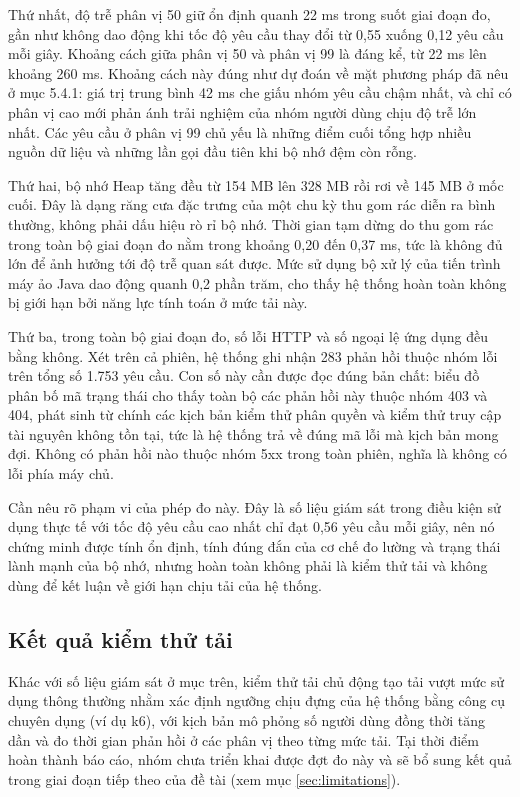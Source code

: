 \documentclass[12pt,a4paper,oneside]{report}
\begin{document}
Thứ nhất, độ trễ phân vị 50 giữ ổn định quanh 22 ms trong suốt giai đoạn đo, gần như không dao động khi tốc độ yêu cầu thay đổi từ 0,55 xuống 0,12 yêu cầu mỗi giây. Khoảng cách giữa phân vị 50 và phân vị 99 là đáng kể, từ 22 ms lên khoảng 260 ms. Khoảng cách này đúng như dự đoán về mặt phương pháp đã nêu ở mục 5.4.1: giá trị trung bình 42 ms che giấu nhóm yêu cầu chậm nhất, và chỉ có phân vị cao mới phản ánh trải nghiệm của nhóm người dùng chịu độ trễ lớn nhất. Các yêu cầu ở phân vị 99 chủ yếu là những điểm cuối tổng hợp nhiều nguồn dữ liệu và những lần gọi đầu tiên khi bộ nhớ đệm còn rỗng.

Thứ hai, bộ nhớ Heap tăng đều từ 154 MB lên 328 MB rồi rơi về 145 MB ở mốc cuối. Đây là dạng răng cưa đặc trưng của một chu kỳ thu gom rác diễn ra bình thường, không phải dấu hiệu rò rỉ bộ nhớ. Thời gian tạm dừng do thu gom rác trong toàn bộ giai đoạn đo nằm trong khoảng 0,20 đến 0,37 ms, tức là không đủ lớn để ảnh hưởng tới độ trễ quan sát được. Mức sử dụng bộ xử lý của tiến trình máy ảo Java dao động quanh 0,2 phần trăm, cho thấy hệ thống hoàn toàn không bị giới hạn bởi năng lực tính toán ở mức tải này.

Thứ ba, trong toàn bộ giai đoạn đo, số lỗi HTTP và số ngoại lệ ứng dụng đều bằng không. Xét trên cả phiên, hệ thống ghi nhận 283 phản hồi thuộc nhóm lỗi trên tổng số 1.753 yêu cầu. Con số này cần được đọc đúng bản chất: biểu đồ phân bố mã trạng thái cho thấy toàn bộ các phản hồi này thuộc nhóm 403 và 404, phát sinh từ chính các kịch bản kiểm thử phân quyền và kiểm thử truy cập tài nguyên không tồn tại, tức là hệ thống trả về đúng mã lỗi mà kịch bản mong đợi. Không có phản hồi nào thuộc nhóm 5xx trong toàn phiên, nghĩa là không có lỗi phía máy chủ.

Cần nêu rõ phạm vi của phép đo này. Đây là số liệu giám sát trong điều kiện sử dụng thực tế với tốc độ yêu cầu cao nhất chỉ đạt 0,56 yêu cầu mỗi giây, nên nó chứng minh được tính ổn định, tính đúng đắn của cơ chế đo lường và trạng thái lành mạnh của bộ nhớ, nhưng hoàn toàn không phải là kiểm thử tải và không dùng để kết luận về giới hạn chịu tải của hệ thống.

\subsection{Kết quả kiểm thử tải}
\label{subsec:loadtest}

Khác với số liệu giám sát ở mục trên, kiểm thử tải chủ động tạo tải vượt mức sử dụng thông thường nhằm xác định ngưỡng chịu đựng của hệ thống bằng công cụ chuyên dụng (ví dụ k6), với kịch bản mô phỏng số người dùng đồng thời tăng dần và đo thời gian phản hồi ở các phân vị theo từng mức tải. Tại thời điểm hoàn thành báo cáo, nhóm chưa triển khai được đợt đo này và sẽ bổ sung kết quả trong giai đoạn tiếp theo của đề tài (xem mục \ref{sec:limitations}).
\end{document}
